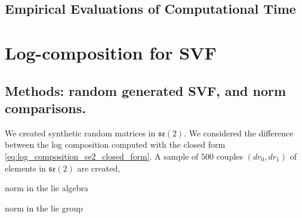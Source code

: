 \subsection{Empirical Evaluations of Computational Time}


\section{Log-composition for SVF}


\subsection{Methods: random generated SVF, and norm comparisons.}
We created synthetic random matrices in $\mathfrak{se}(2)$. We considered the difference between the log composition computed with the closed form \ref{eq:log_composition_se2_closed_form}. 
A sample of $500$ couples $(dr_0,dr_1)$ of elements in $\mathfrak{se}(2)$ are created, 

norm in the lie algebra

norm in the lie group


